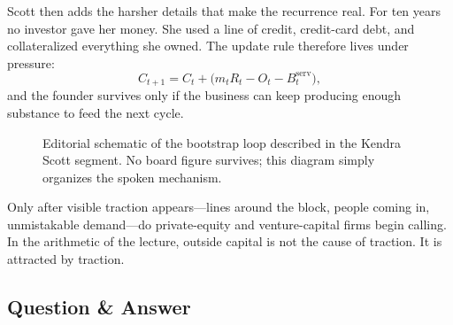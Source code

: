 Scott then adds the harsher details that make the recurrence real. For ten years no investor gave her money. She used a line of credit, credit-card debt, and collateralized everything she owned. The update rule therefore lives under pressure:
\begin{equation}
C_{t+1}=C_t+\bigl(m_tR_t-O_t-B_t^{\text{serv}}\bigr),
\end{equation}
and the founder survives only if the business can keep producing enough substance to feed the next cycle.

\begin{figure}[h]
\centering
{}
\caption{Editorial schematic of the bootstrap loop described in the Kendra Scott segment. No board figure survives; this diagram simply organizes the spoken mechanism.}
\end{figure}

Only after visible traction appears---lines around the block, people coming in, unmistakable demand---do private-equity and venture-capital firms begin calling. In the arithmetic of the lecture, outside capital is not the cause of traction. It is attracted by traction.

\subsection{Question \& Answer}

